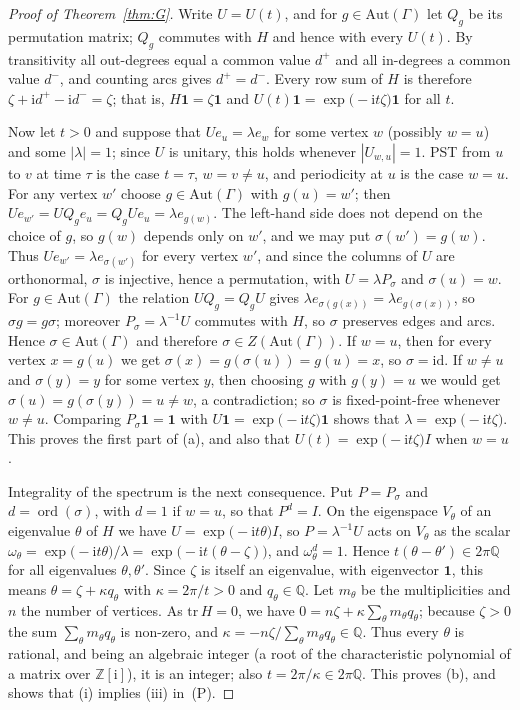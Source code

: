 \documentclass[preprint,11pt]{elsarticle}
\theoremstyle{definition}
\theoremstyle{remark}
\DeclareMathOperator{\ord}{ord}
\newcommand{\Z}{\mathbb Z}
\newcommand{\Q}{\mathbb Q}
\newcommand{\ii}{\mathrm i}
\begin{document}
\begin{proof}[Proof of Theorem~\ref{thm:G}]
Write $U=U(t)$, and for $g\in\mathrm{Aut}(\Gamma)$ let $Q_g$ be its permutation matrix; $Q_g$ commutes with $H$ and hence with every $U(t)$. By transitivity all out-degrees equal a common value $d^+$ and all in-degrees a common value $d^-$, and counting arcs gives $d^+=d^-$. Every row sum of $H$ is therefore $\zeta+\ii d^+-\ii d^-=\zeta$; that is, $H\mathbf 1=\zeta\mathbf 1$ and $U(t)\mathbf 1=\exp\bigl(-\ii t\zeta\bigr)\mathbf 1$ for all $t$.

Now let $t>0$ and suppose that $Ue_u=\lambda e_w$ for some vertex $w$ (possibly $w=u$) and some $|\lambda|=1$; since $U$ is unitary, this holds whenever $|U_{w,u}|=1$. PST from $u$ to $v$ at time $\tau$ is the case $t=\tau$, $w=v\ne u$, and periodicity at $u$ is the case $w=u$. For any vertex $w'$ choose $g\in\mathrm{Aut}(\Gamma)$ with $g(u)=w'$; then $Ue_{w'}=UQ_ge_u=Q_gUe_u=\lambda e_{g(w)}$. The left-hand side does not depend on the choice of $g$, so $g(w)$ depends only on $w'$, and we may put $\sigma(w')=g(w)$. Thus $Ue_{w'}=\lambda e_{\sigma(w')}$ for every vertex $w'$, and since the columns of $U$ are orthonormal, $\sigma$ is injective, hence a permutation, with $U=\lambda P_\sigma$ and $\sigma(u)=w$. For $g\in\mathrm{Aut}(\Gamma)$ the relation $UQ_g=Q_gU$ gives $\lambda e_{\sigma(g(x))}=\lambda e_{g(\sigma(x))}$, so $\sigma g=g\sigma$; moreover $P_\sigma=\lambda^{-1}U$ commutes with $H$, so $\sigma$ preserves edges and arcs. Hence $\sigma\in\mathrm{Aut}(\Gamma)$ and therefore $\sigma\in Z(\mathrm{Aut}(\Gamma))$. If $w=u$, then for every vertex $x=g(u)$ we get $\sigma(x)=g(\sigma(u))=g(u)=x$, so $\sigma=\mathrm{id}$. If $w\ne u$ and $\sigma(y)=y$ for some vertex $y$, then choosing $g$ with $g(y)=u$ we would get $\sigma(u)=g(\sigma(y))=u\ne w$, a contradiction; so $\sigma$ is fixed-point-free whenever $w\ne u$. Comparing $P_\sigma\mathbf 1=\mathbf 1$ with $U\mathbf 1=\exp\bigl(-\ii t\zeta\bigr)\mathbf 1$ shows that $\lambda=\exp\bigl(-\ii t\zeta\bigr)$. This proves the first part of (a), and also that $U(t)=\exp\bigl(-\ii t\zeta\bigr)I$ when $w=u$.

Integrality of the spectrum is the next consequence. Put $P=P_\sigma$ and $d=\ord(\sigma)$, with $d=1$ if $w=u$, so that $P^d=I$. On the eigenspace $V_\theta$ of an eigenvalue $\theta$ of $H$ we have $U=\exp\bigl(-\ii t\theta\bigr)I$, so $P=\lambda^{-1}U$ acts on $V_\theta$ as the scalar $\omega_\theta=\exp\bigl(-\ii t\theta\bigr)/\lambda=\exp\bigl(-\ii t(\theta-\zeta)\bigr)$, and $\omega_\theta^d=1$. Hence $t(\theta-\theta')\in2\pi\Q$ for all eigenvalues $\theta,\theta'$. Since $\zeta$ is itself an eigenvalue, with eigenvector $\mathbf 1$, this means $\theta=\zeta+\kappa q_\theta$ with $\kappa=2\pi/t>0$ and $q_\theta\in\Q$. Let $m_\theta$ be the multiplicities and $n$ the number of vertices. As $\mathrm{tr}\,H=0$, we have $0=n\zeta+\kappa\sum_\theta m_\theta q_\theta$; because $\zeta>0$ the sum $\sum_\theta m_\theta q_\theta$ is non-zero, and $\kappa=-n\zeta/\sum_\theta m_\theta q_\theta\in\Q$. Thus every $\theta$ is rational, and being an algebraic integer (a root of the characteristic polynomial of a matrix over $\Z[\ii]$), it is an integer; also $t=2\pi/\kappa\in2\pi\Q$. This proves (b), and shows that (i) implies (iii) in~(P).


\end{proof}
\end{document}
